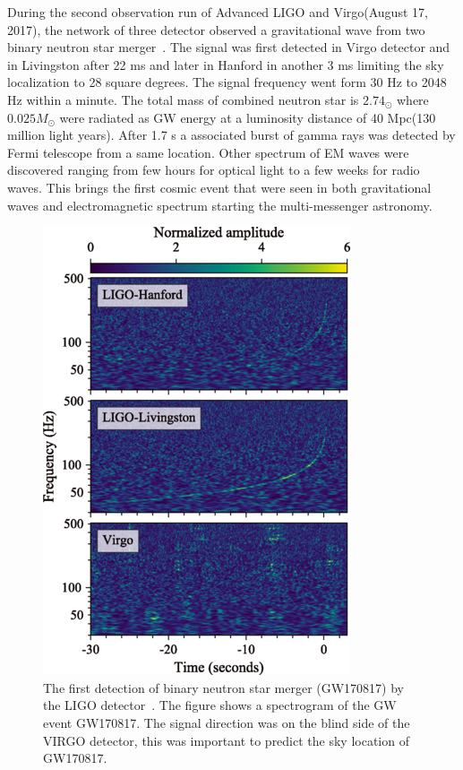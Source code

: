\documentclass{ttuthes2007}
\begin{document}
During the second observation run of Advanced LIGO and Virgo(August 17, 2017),
the network of three detector observed a gravitational wave from two binary
neutron star merger~\cite{Abbott_2017}. The signal was first detected in Virgo
detector and in Livingston after 22 ms and later in Hanford in another 3 ms
limiting the sky localization to 28 square degrees. The signal frequency went
form 30 Hz to 2048 Hz within a minute. The total mass of combined neutron star
is $2.74_\odot$ where $0.025 M_\odot$ were radiated as \ac{GW} energy at a
luminosity distance of 40 Mpc(130 million light years). After 1.7 s a associated
burst of gamma rays was detected by Fermi telescope from a same  location. Other
spectrum of \ac{EM} waves were discovered ranging from few hours for optical
light to a few weeks for radio waves.  This brings the first cosmic event that
were seen in both gravitational waves and electromagnetic spectrum starting the
multi-messenger astronomy. 
\begin{figure}[bhtp!] 
        \includegraphics[width=\textwidth]{figure/GW170817.png}
	\caption{The first detection of binary neutron star merger (GW170817) by
the \ac{LIGO} detector~\cite{Abbott_2017}. The figure shows a spectrogram of the \ac{GW} event
GW170817. The signal direction was on the blind side of the VIRGO detector, this
was important to predict the sky location of GW170817.  }
        \label{GW170817}                                                             
\end{figure}      
\end{document}
